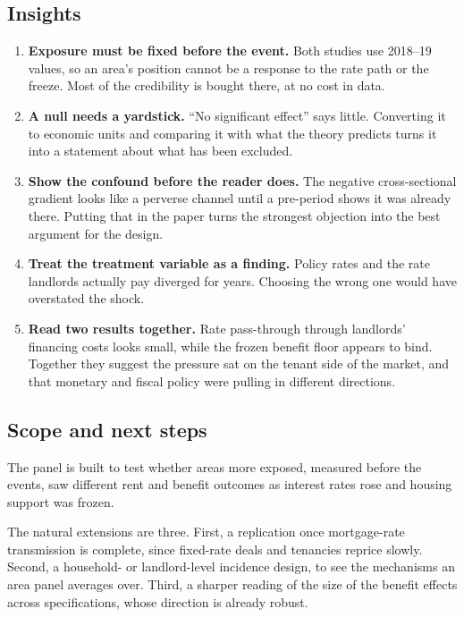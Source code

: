 \documentclass[
  british,
  a4paper,
]{article}
\providecommand{\tightlist}{%
  \setlength{\itemsep}{0pt}\setlength{\parskip}{0pt}}
\begin{document}
\subsection{Insights}\label{insights}

\begin{enumerate}
\def\labelenumi{\arabic{enumi}.}
\tightlist
\item
  \textbf{Exposure must be fixed before the event.} Both studies use
  2018--19 values, so an area's position cannot be a response to the
  rate path or the freeze. Most of the credibility is bought there, at
  no cost in data.
\item
  \textbf{A null needs a yardstick.} ``No significant effect'' says
  little. Converting it to economic units and comparing it with what the
  theory predicts turns it into a statement about what has been
  excluded.
\item
  \textbf{Show the confound before the reader does.} The negative
  cross-sectional gradient looks like a perverse channel until a
  pre-period shows it was already there. Putting that in the paper turns
  the strongest objection into the best argument for the design.
\item
  \textbf{Treat the treatment variable as a finding.} Policy rates and
  the rate landlords actually pay diverged for years. Choosing the wrong
  one would have overstated the shock.
\item
  \textbf{Read two results together.} Rate pass-through through
  landlords' financing costs looks small, while the frozen benefit floor
  appears to bind. Together they suggest the pressure sat on the tenant
  side of the market, and that monetary and fiscal policy were pulling
  in different directions.
\end{enumerate}

\subsection{Scope and next steps}\label{scope-and-next-steps}

The panel is built to test whether areas more exposed, measured before
the events, saw different rent and benefit outcomes as interest rates
rose and housing support was frozen.

The natural extensions are three. First, a replication once
mortgage-rate transmission is complete, since fixed-rate deals and
tenancies reprice slowly. Second, a household- or landlord-level
incidence design, to see the mechanisms an area panel averages over.
Third, a sharper reading of the size of the benefit effects across
specifications, whose direction is already robust.
\end{document}
